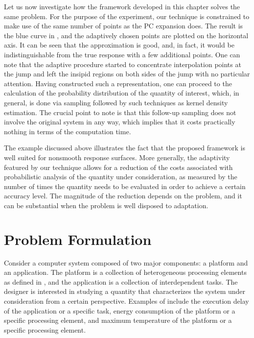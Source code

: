 Let us now investigate how the framework developed in this chapter solves the
same problem. For the purpose of the experiment, our technique is constrained to
make use of the same number of points as the \ac{PC} expansion does. The result
is the blue curve in , and the adaptively chosen
points are plotted on the horizontal axis. It can be seen that the approximation
is good, and, in fact, it would be indistinguishable from the true response with
a few additional points. One can note that the adaptive procedure started to
concentrate interpolation points at the jump and left the insipid regions on
both sides of the jump with no particular attention. Having constructed such a
representation, one can proceed to the calculation of the probability
distribution of the quantity of interest, which, in general, is done via
sampling followed by such techniques as kernel density estimation. The crucial
point to note is that this follow-up sampling does not involve the original
system in any way, which implies that it costs practically nothing in terms of
the computation time.

The example discussed above illustrates the fact that the proposed framework is
well suited for nonsmooth response surfaces. More generally, the adaptivity
featured by our technique allows for a reduction of the costs associated with
probabilistic analysis of the quantity under consideration, as measured by the
number of times the quantity needs to be evaluated in order to achieve a certain
accuracy level. The magnitude of the reduction depends on the problem, and it
can be substantial when the problem is well disposed to adaptation.

\section{Problem Formulation}

Consider a computer system composed of two major components: a platform and an
application. The platform is a collection of heterogeneous processing elements
as defined in , and the application is a collection of
interdependent tasks. The designer is interested in studying a quantity \g that
characterizes the system under consideration from a certain perspective.
Examples of \g include the execution delay of the application or a specific
task, energy consumption of the platform or a specific processing element, and
maximum temperature of the platform or a specific processing element.

